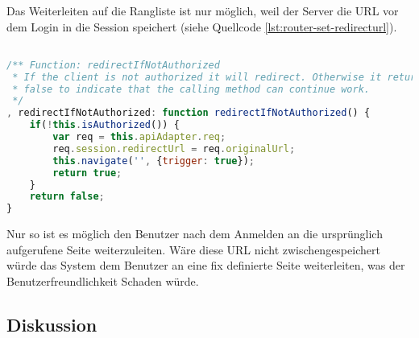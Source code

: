 Das Weiterleiten auf die Rangliste ist nur möglich, weil der Server die \gls{URL} vor dem Login in die Session speichert (siehe Quellcode \ref{lst:router-set-redirecturl}).

\begin{lstlisting}[language=JavaScript, caption=Router - Autorisationskontrolle \cite{roomiesRouter}, label=lst:router-set-redirecturl, firstnumber=225]

/** Function: redirectIfNotAuthorized
 * If the client is not authorized it will redirect. Otherwise it returns
 * false to indicate that the calling method can continue work.
 */
, redirectIfNotAuthorized: function redirectIfNotAuthorized() {
	if(!this.isAuthorized()) {
		var req = this.apiAdapter.req;
		req.session.redirectUrl = req.originalUrl;
		this.navigate('', {trigger: true});
		return true;
	}
	return false;
}
\end{lstlisting}

Nur so ist es möglich den Benutzer nach dem Anmelden an die ursprünglich aufgerufene Seite weiterzuleiten. Wäre diese \gls{URL} nicht zwischengespeichert würde das System dem Benutzer an eine fix definierte Seite weiterleiten, was der Benutzerfreundlichkeit Schaden würde.

\subsection*{Diskussion}
